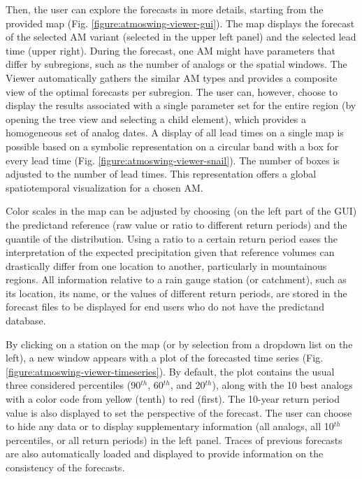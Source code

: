 \documentclass[gmd]{copernicus}
\begin{document}
Then, the user can explore the forecasts in more details, starting from the provided map (Fig. \ref{figure:atmoswing-viewer-gui}). The map displays the forecast of the selected AM variant (selected in the upper left panel) and the selected lead time (upper right). During the forecast, one AM might have parameters that differ by subregions, such as the number of analogs or the spatial windows. The Viewer automatically gathers the similar AM types and provides a composite view of the optimal forecasts per subregion. The user can, however, choose to display the results associated with a single parameter set for the entire region (by opening the tree view and selecting a child element), which provides a homogeneous set of analog dates. A display of all lead times on a single map is possible based on a symbolic representation on a circular band with a box for every lead time (Fig. \ref{figure:atmoswing-viewer-snail}). The number of boxes is adjusted to the number of lead times. This representation offers a global spatiotemporal visualization for a chosen AM.

Color scales in the map can be adjusted by choosing (on the left part of the GUI) the predictand reference (raw value or ratio to different return periods) and the quantile of the distribution. Using a ratio to a certain return period eases the interpretation of the expected precipitation given that reference volumes can drastically differ from one location to another, particularly in mountainous regions. All information relative to a rain gauge station (or catchment), such as its location, its name, or the values of different return periods, are stored in the forecast files to be displayed for end users who do not have the predictand database.

By clicking on a station on the map (or by selection from a dropdown list on the left), a new window appears with a plot of the forecasted time series (Fig. \ref{figure:atmoswing-viewer-timeseries}). By default, the plot contains the usual three considered percentiles (90$^{th}$, 60$^{th}$, and 20$^{th}$), along with the 10 best analogs with a color code from yellow (tenth) to red (first). The 10-year return period value is also displayed to set the perspective of the forecast. The user can choose to hide any data or to display supplementary information (all analogs, all 10$^{th}$ percentiles, or all return periods) in the left panel. Traces of previous forecasts are also automatically loaded and displayed to provide information on the consistency of the forecasts. 
\end{document}
